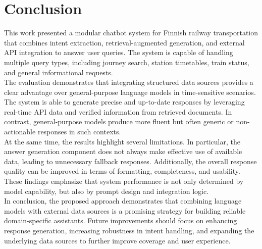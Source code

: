 \documentclass[fleqn,moreauthors,10pt]{ds_report}
\begin{document}
\section*{Conclusion}
This work presented a modular chatbot system for Finnish railway transportation that combines intent extraction, retrieval-augmented generation, and external API integration to answer user queries. The system is capable of handling multiple query types, including journey search, station timetables, train status, and general informational requests. \\
The evaluation demonstrates that integrating structured data sources provides a clear advantage over general-purpose language models in time-sensitive scenarios. The system is able to generate precise and up-to-date responses by leveraging real-time API data and verified information from retrieved documents. In contrast, general-purpose models produce more fluent but often generic or non-actionable responses in such contexts. \\
At the same time, the results highlight several limitations. In particular, the answer generation component does not always make effective use of available data, leading to unnecessary fallback responses. Additionally, the overall response quality can be improved in terms of formatting, completeness, and usability. These findings emphasize that system performance is not only determined by model capability, but also by prompt design and integration logic. \\
In conclusion, the proposed approach demonstrates that combining language models with external data sources is a promising strategy for building reliable domain-specific assistants. Future improvements should focus on enhancing response generation, increasing robustness in intent handling, and expanding the underlying data sources to further improve coverage and user experience.

\end{document}
